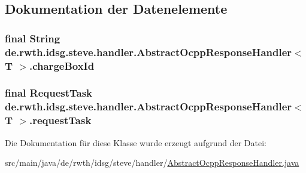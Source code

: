 \subsection{Dokumentation der Datenelemente}
\hypertarget{classde_1_1rwth_1_1idsg_1_1steve_1_1handler_1_1_abstract_ocpp_response_handler_3_01_t_01_4_a8c07bdb598803efe236906c96a8d21a6}{
\subsubsection[{charge\-Box\-Id}]{\setlength{\rightskip}{0pt plus 5cm}final String de.\-rwth.\-idsg.\-steve.\-handler.\-Abstract\-Ocpp\-Response\-Handler$<$ T $>$.charge\-Box\-Id\hspace{0.3cm}{\ttfamily [protected]}}}\label{classde_1_1rwth_1_1idsg_1_1steve_1_1handler_1_1_abstract_ocpp_response_handler_3_01_t_01_4_a8c07bdb598803efe236906c96a8d21a6}
\hypertarget{classde_1_1rwth_1_1idsg_1_1steve_1_1handler_1_1_abstract_ocpp_response_handler_3_01_t_01_4_afbad6820ded6580e25792d7a4b893465}{
\subsubsection[{request\-Task}]{\setlength{\rightskip}{0pt plus 5cm}final {\bf Request\-Task} de.\-rwth.\-idsg.\-steve.\-handler.\-Abstract\-Ocpp\-Response\-Handler$<$ T $>$.request\-Task\hspace{0.3cm}{\ttfamily [protected]}}}\label{classde_1_1rwth_1_1idsg_1_1steve_1_1handler_1_1_abstract_ocpp_response_handler_3_01_t_01_4_afbad6820ded6580e25792d7a4b893465}


Die Dokumentation für diese Klasse wurde erzeugt aufgrund der Datei\-:\begin{DoxyCompactItemize}
\item 
src/main/java/de/rwth/idsg/steve/handler/\hyperlink{_abstract_ocpp_response_handler_8java}{Abstract\-Ocpp\-Response\-Handler.\-java}\end{DoxyCompactItemize}
